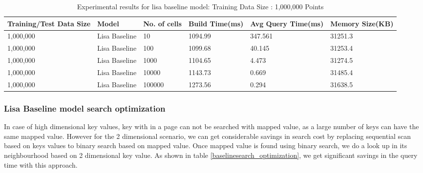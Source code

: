 \begin{table}[ht]
	\centering
	\begin{tabular}{||p{}<{\centering}|p{}<{\centering}| p{}<{\centering}|p{}<{\centering}|p{}<{\centering}|p{}<{\centering}||}
		\hline
		Training/Test Data Size& Model & No. of cells & Build Time(ms) & Avg Query Time(ms) & Memory Size(KB)\\ [0.5ex] 
		\hline
		\hline
		1,000,000& Lisa Baseline & 10 & 1094.99 & 347.561 & 31251.3\\
		\hline
		1,000,000& Lisa Baseline & 100 &1099.68 &40.145 & 31253.4\\
		\hline
		1,000,000& Lisa Baseline & 1000 & 1104.65 & 4.473 & 31274.5\\
		\hline
		1,000,000& Lisa Baseline & 10000 & 1143.73 & 0.669 & 31485.4\\
		\hline
		1,000,000& Lisa Baseline & 100000 & 1273.56 & 0.294 & 31638.5\\
		\hline
		\hline
	\end{tabular}
    \label{small_lognormal_lisa_baseline_10000}
	\caption{Experimental results for lisa baseline model: Training Data Size : 1,000,000 Points}
\end{table}


\subsubsection {Lisa Baseline model search optimization}
In case of high dimensional key values, key with in a page can not be searched with mapped value, as a large number of keys can have the same mapped value. However for the 2 dimensional scenario, we can get considerable savings in search cost by replacing sequential scan based on keys values to binary search based on mapped value. Once mapped value is found using binary search, we do a look up in its neighbourhood based on 2 dimensional key value. As shown in table \ref{baselinesearch_optimization}, we get significant savings in the query time with this approach.

